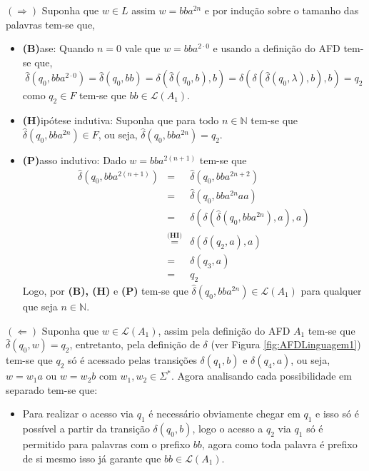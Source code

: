 \begin{prova}
  $(\Rightarrow)$ Suponha que $w \in L$ assim $w = bba^{2n}$ e por indução sobre o tamanho das palavras tem-se que,
  \begin{itemize}
    \item[ ] \textbf{(B)}ase: Quando $n = 0$ vale que $w = bba^{2\cdot 0}$ e usando a definição do AFD tem-se que, 
    $$\widehat{\delta}(q_0, bba^{2\cdot 0}) = \widehat{\delta}(q_0, bb) = \delta(\widehat{\delta}(q_0, b), b) = \delta(\delta(\widehat{\delta}(q_0, \lambda), b), b) = q_2$$
    como $q_2 \in F$ tem-se que $bb \in \mathcal{L}(A_1)$.
    \item[ ] \textbf{(H)}ipótese indutiva: Suponha que para todo $n \in \mathbb{N}$ tem-se que $\widehat{\delta}(q_0, bba^{2n}) \in F$, ou seja, $\widehat{\delta}(q_0, bba^{2n}) = q_2$.
    \item[ ] \textbf{(P)}asso indutivo: Dado $w = bba^{2(n+1)}$ tem-se que
    \begin{eqnarray*}
      \widehat{\delta}(q_0, bba^{2(n+1)}) & = & \widehat{\delta}(q_0, bba^{2n + 2})\\
      & = & \widehat{\delta}(q_0, bba^{2n}aa)\\
      & = & \delta(\delta(\widehat{\delta}(q_0, bba^{2n}), a), a)\\
      & \stackrel{\textbf{(HI)}}{=} & \delta(\delta(q_2, a), a)\\
      & = & \delta(q_3, a)\\
      & = & q_2
    \end{eqnarray*} 
    Logo, por \textbf{(B), (H)} e \textbf{(P)} tem-se que $\widehat{\delta}(q_0, bba^{2n}) \in \mathcal{L}(A_1)$ para qualquer que seja $n \in \mathbb{N}$.  
  \end{itemize}
  $(\Leftarrow)$ Suponha que $w \in \mathcal{L}(A_1)$, assim pela definição do AFD $A_1$ tem-se que $\widehat{\delta}(q_0, w) = q_2$, entretanto, pela definição de $\delta$ (ver Figura \ref{fig:AFDLinguagem1}) tem-se que $q_2$ só é acessado pelas transições $\delta(q_1, b)$ e $\delta(q_4, a)$, ou seja, $w = w_1a$ ou $w = w_2b$ com $w_1, w_2 \in \Sigma^*$. Agora analisando cada possibilidade em separado tem-se que: 
  \begin{itemize}
    \item Para realizar o acesso via $q_1$ é necessário obviamente chegar em $q_1$ e isso só é possível a partir da transição $\delta(q_0, b)$, logo o acesso a $q_2$ via $q_1$ só é permitido para palavras com o prefixo $bb$, agora como toda palavra é prefixo de si mesmo isso já garante que $bb \in \mathcal{L}(A_1)$.

\end{itemize}
\end{prova}
